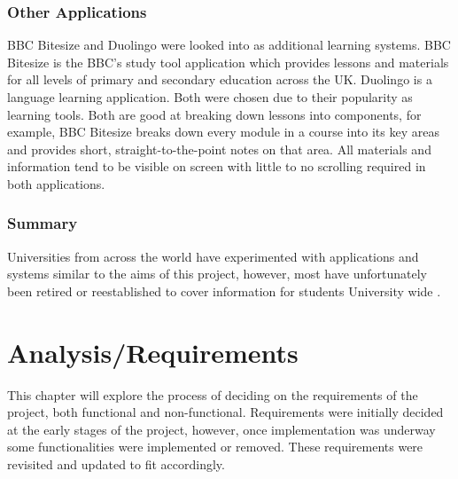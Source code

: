 \documentclass{l4proj}
\begin{document}
\subsection{Other Applications}
BBC Bitesize and Duolingo were looked into as additional learning systems. BBC Bitesize is the BBC's study tool application which provides lessons and materials for all levels of primary and secondary education across the UK. Duolingo is a language learning application. Both were chosen due to their popularity as learning tools. Both are good at breaking down lessons into components,  for example,   BBC Bitesize breaks down every module in a course into its key areas and provides short,  straight-to-the-point notes on that area. All materials and information tend to be visible on screen with little to no scrolling required in both applications.

\subsection{Summary}
Universities from across the world have experimented with applications and systems similar to the aims of this project,  however,  most have unfortunately been retired or reestablished to cover information for students University wide .

\chapter{Analysis/Requirements} \label{Requierments}

This chapter will explore the process of deciding on the requirements of the project,  both functional and non-functional. Requirements were initially decided at the early stages of the project,  however,  once implementation was underway some functionalities were implemented or removed. These requirements were revisited and updated to fit accordingly.
\end{document}
